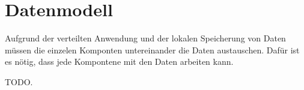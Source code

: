 
\section{Datenmodell}

Aufgrund der verteilten Anwendung und der lokalen Speicherung von Daten müssen die einzelen Komponten untereinander die Daten austauschen. Dafür ist es nötig, dass jede Kompontene mit den Daten arbeiten kann.


TODO.
